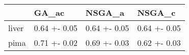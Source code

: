 \begin{tabular}{llll}
\toprule
{} &         GA\_ac &        NSGA\_a &        NSGA\_c \\
\midrule
liver &  0.64 +- 0.05 &  0.64 +- 0.05 &  0.64 +- 0.05 \\
pima  &  0.71 +- 0.02 &  0.69 +- 0.03 &  0.62 +- 0.03 \\
\bottomrule
\end{tabular}

